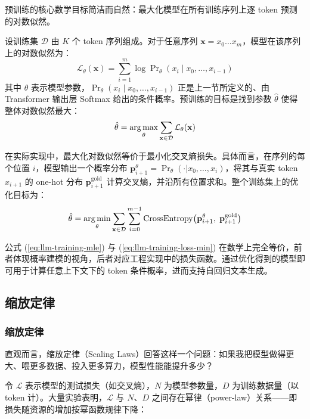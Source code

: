 预训练的核心数学目标简洁而自然：最大化模型在所有训练序列上逐 token 预测的对数似然。

设训练集 $\mathcal{D}$ 由 $K$ 个 token 序列组成。对于任意序列 $\mathbf{x} = x_0\ldots x_m$，模型在该序列上的对数似然为：
\begin{equation}
  \mathcal{L}_{\theta}(\mathbf{x}) = \sum_{i=1}^{m} \log \Pr\nolimits_{\theta}(x_i \mid x_0,\dots,x_{i-1})
  \label{eq:llm-training-loss}
\end{equation}
其中 $\theta$ 表示模型参数，$\Pr_{\theta}(x_i \mid x_0,\dots,x_{i-1})$ 正是上一节所定义的、由 Transformer 输出层 Softmax 给出的条件概率。预训练的目标是找到参数 $\hat{\theta}$ 使得整体对数似然最大：
\begin{equation}
  \hat{\theta} = \operatorname*{arg\,max}_{\theta} \sum_{\mathbf{x} \in \mathcal{D}} \mathcal{L}_{\theta}(\mathbf{x})
  \label{eq:llm-training-mle}
\end{equation}

在实际实现中，最大化对数似然等价于最小化交叉熵损失。具体而言，在序列的每个位置 $i$，模型输出一个概率分布 $\mathbf{p}_{i+1}^{\theta} = \Pr_{\theta}(\cdot|x_0,\dots,x_i)$，将其与真实 token $x_{i+1}$ 的 one-hot 分布 $\mathbf{p}_{i+1}^{\mathrm{gold}}$ 计算交叉熵，并沿所有位置求和。整个训练集上的优化目标为：
\begin{equation}
  \hat{\theta} = \operatorname*{arg\,min}_{\theta} \sum_{\mathbf{x} \in \mathcal{D}} \sum_{i=0}^{m-1} \mathrm{CrossEntropy}\big(\mathbf{p}_{i+1}^{\theta},\; \mathbf{p}_{i+1}^{\mathrm{gold}}\big)
  \label{eq:llm-training-loss-min}
\end{equation}

公式 (\ref{eq:llm-training-mle}) 与 (\ref{eq:llm-training-loss-min}) 在数学上完全等价，前者体现概率建模的视角，后者对应工程实现中的损失函数。通过优化得到的模型即可用于计算任意上下文下的 token 条件概率，进而支持自回归文本生成。


\subsection{缩放定律}
\label{sec:llm-training-at-scale}

\subsubsection{缩放定律}

直观而言，缩放定律（Scaling Laws）回答这样一个问题：如果我把模型做得更大、喂更多数据、投入更多算力，模型性能能提升多少？

令 $\mathcal{L}$ 表示模型的测试损失（如交叉熵），$N$ 为模型参数量，$D$ 为训练数据量（以 token 计）。大量实验表明，$\mathcal{L}$ 与 $N$、$D$ 之间存在幂律（power-law）关系——即损失随资源的增加按幂函数规律下降：

